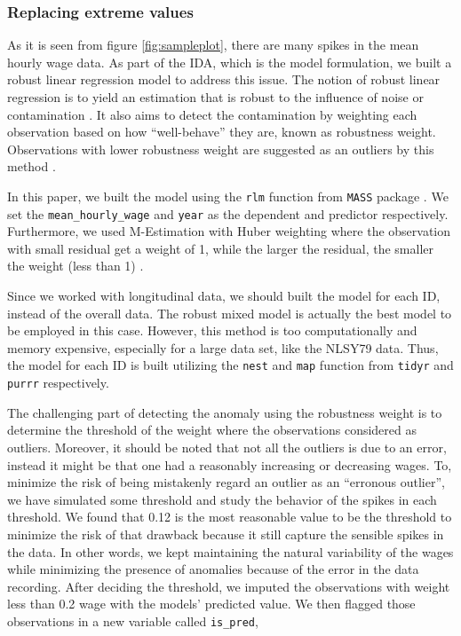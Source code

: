 \hypertarget{replacing-extreme-values}{%
\subsubsection{Replacing extreme
values}\label{replacing-extreme-values}}

As it is seen from figure \ref{fig:sampleplot}, there are many spikes in
the mean hourly wage data. As part of the IDA, which is the model
formulation, we built a robust linear regression model to address this
issue. The notion of robust linear regression is to yield an estimation
that is robust to the influence of noise or contamination
\citep{KollerManuel2016rARP}. It also aims to detect the contamination
by weighting each observation based on how ``well-behave'' they are,
known as robustness weight. Observations with lower robustness weight
are suggested as an outliers by this method
\citep{KollerManuel2016rARP}.

In this paper, we built the model using the \texttt{rlm} function from
\texttt{MASS} package \citep{mass}. We set the
\texttt{mean\_hourly\_wage} and \texttt{year} as the dependent and
predictor respectively. Furthermore, we used M-Estimation with Huber
weighting where the observation with small residual get a weight of 1,
while the larger the residual, the smaller the weight (less than 1)
\citep{rlm}.

Since we worked with longitudinal data, we should built the model for
each ID, instead of the overall data. The robust mixed model is actually
the best model to be employed in this case. However, this method is too
computationally and memory expensive, especially for a large data set,
like the NLSY79 data. Thus, the model for each ID is built utilizing the
\texttt{nest} and \texttt{map} function from \texttt{tidyr}
\citep{tidyr} and \texttt{purrr} \citep{purrr} respectively.

The challenging part of detecting the anomaly using the robustness
weight is to determine the threshold of the weight where the
observations considered as outliers. Moreover, it should be noted that
not all the outliers is due to an error, instead it might be that one
had a reasonably increasing or decreasing wages. To, minimize the risk
of being mistakenly regard an outlier as an ``erronous outlier'', we
have simulated some threshold and study the behavior of the spikes in
each threshold. We found that 0.12 is the most reasonable value to be
the threshold to minimize the risk of that drawback because it still
capture the sensible spikes in the data. In other words, we kept
maintaining the natural variability of the wages while minimizing the
presence of anomalies because of the error in the data recording. After
deciding the threshold, we imputed the observations with weight less
than 0.2 wage with the models' predicted value. We then flagged those
observations in a new variable called \texttt{is\_pred},

